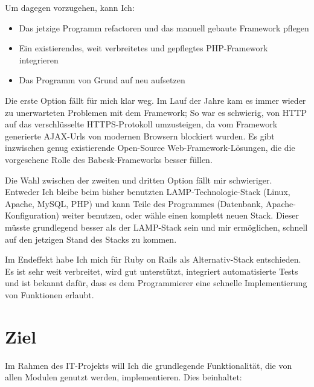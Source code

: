 \documentclass[a4paper,10pt]{scrartcl}
\begin{document}
    Um dagegen vorzugehen, kann Ich:

    \begin{itemize}
      \item Das jetzige Programm refactoren und das manuell gebaute Framework
          pflegen
      \item Ein existierendes, weit verbreitetes und gepflegtes PHP-Framework
          integrieren
      \item Das Programm von Grund auf neu aufsetzen
    \end{itemize}

    Die erste Option fällt für mich klar weg.
    Im Lauf der Jahre kam es immer wieder zu unerwarteten Problemen mit dem
    Framework; So war es schwierig, von HTTP auf das verschlüsselte
    HTTPS-Protokoll umzusteigen, da vom Framework generierte AJAX-Urls von
    modernen Browsern blockiert wurden.
    Es gibt inzwischen genug existierende Open-Source Web-Framework-Lösungen,
    die die vorgesehene Rolle des Babesk-Frameworks besser füllen.

    Die Wahl zwischen der zweiten und dritten Option fällt mir schwieriger.
    Entweder Ich bleibe beim bisher benutzten LAMP-Technologie-Stack
    (Linux, Apache, MySQL, PHP) und kann Teile des Programmes
    (Datenbank, Apache-Konfiguration) weiter benutzen, oder wähle einen komplett
    neuen Stack.
    Dieser müsste grundlegend besser als der LAMP-Stack sein und mir
    ermöglichen, schnell auf den jetzigen Stand des Stacks zu kommen.

    Im Endeffekt habe Ich mich für Ruby on Rails als Alternativ-Stack
    entschieden.
    Es ist sehr weit verbreitet, wird gut unterstützt, integriert automatisierte
    Tests und ist bekannt dafür, dass es dem Programmierer eine schnelle
    Implementierung von Funktionen erlaubt.

\section{Ziel}

  Im Rahmen des IT-Projekts will Ich die grundlegende Funktionalität, die von
  allen Modulen genutzt werden, implementieren.
  Dies beinhaltet:
\end{document}
